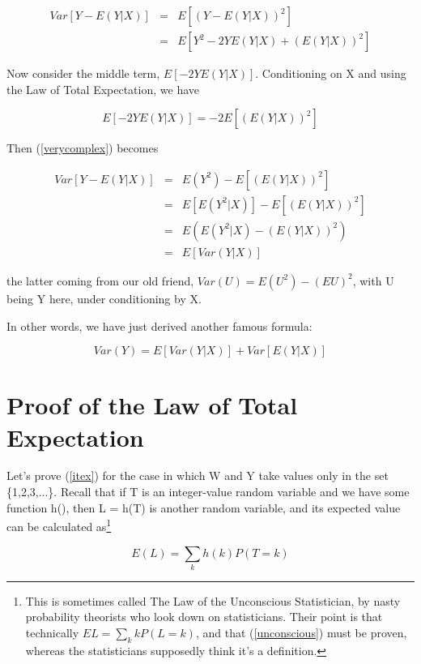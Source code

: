 \begin{eqnarray}
\label{verycomplex}
Var[Y-E(Y|X)] &=& E \left [ (Y-E(Y|X))^2 \right ] \\ 
&=& E \left [ Y^2 -2YE(Y|X) + (E(Y|X))^2 \right ] 
\end{eqnarray}

Now consider the middle term, $E[-2YE(Y|X)]$.  Conditioning on X and
using the Law of Total Expectation, we have

\begin{equation}
E[-2YE(Y|X)] = -2 E \left [ (E(Y|X))^2 \right ]
\end{equation}

Then (\ref{verycomplex}) becomes

\begin{eqnarray}
Var[Y-E(Y|X)] &=& E (Y^2) - E \left [ (E(Y|X))^2 \right ] \\
&=& E \left [ E(Y^2 | X) \right ] - E \left [ (E(Y|X))^2 \right ] \\
&=& E \left ( E(Y^2 | X) - (E(Y|X))^2 \right ) \\
&=& E \left [ Var(Y|X) \right ]
\end{eqnarray}

the latter coming from our old friend, $Var(U) = E(U^2) - (EU)^2$, with
U being Y here, under conditioning by X.

In other words, we have just derived another famous formula:

\begin{equation}
Var(Y) = E[Var(Y|X)] + Var[E(Y|X)]
\end{equation}

\section{Proof of the Law of Total Expectation}
\label{proveitex} 

Let's prove (\ref{itex}) for the case in which W and Y take values only
in the set \{1,2,3,...\}.  Recall that if T is an integer-value random
variable and we have some function h(), then L = h(T) is another random
variable, and its expected value can be calculated as\footnote{This is
sometimes called The Law of the Unconscious Statistician, by nasty
probability theorists who look down on statisticians.  Their point is
that technically $EL = \sum_k k P(L = k)$, and that (\ref{unconscious})
must be proven, whereas the statisticians supposedly think it's a
definition.}  

\begin{equation}
\label{unconscious}
E(L) = \sum_k h(k) P(T = k)
\end{equation}

